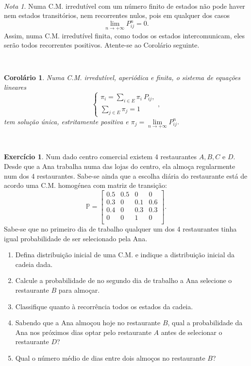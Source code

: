 \documentclass[
  11pt,
  a4paper,
]{book}
\newtheorem{corollary}{Corolário}[chapter]
\theoremstyle{definition}
\theoremstyle{definition}
\theoremstyle{definition}
\newtheorem{exercise}{Exercício}[chapter]
\theoremstyle{definition}
\theoremstyle{remark}
\newtheorem*{remark}{Nota }
\begin{document}
\(\,\)

\begin{remark}
Numa C.M. irredutível com um número finito de estados não pode haver nem estados transitórios, nem recorrentes nulos, pois em qualquer dos casos
\[\lim\limits_{n \to +\infty} P_{ij}^n=0.\]
Assim, numa C.M. irredutível finita, como todos os estados intercomunicam, eles serão todos recorrentes positivos. Atente-se ao Corolário seguinte.
\end{remark}

\(\,\)

\begin{corollary}
Numa C.M. irredutível, aperiódica e finita, o sistema de equações lineares
\[
\begin{cases}
\pi_i = \sum\limits_{i \in E} \pi_i~P_{ij}, \\
\sum\limits_{j \in E} \pi_j =1
\end{cases}, 
\]
tem solução única, estritamente positiva e \(\pi_j=\lim\limits_{n \to +\infty} P_{ij}^n\).
\end{corollary}

\(\,\)

\begin{exercise}

Num dado centro comercial existem 4 restaurantes \(A,B,C\) e \(D\). Desde que a Ana trabalha numa das lojas do centro, ela almoça regularmente num dos 4 restaurantes. Sabe-se ainda que a escolha diária do restaurante está de acordo uma C.M. homogénea com matriz de transição:
\[
\mathbb{P} =
\begin{bmatrix}
0.5 & 0.5 & 0 & 0   \\
0.3 & 0 & 0.1 & 0.6   \\
0.4 & 0 & 0.3 & 0.3   \\
0 & 0 & 1 & 0   \\
\end{bmatrix}.
\]
Sabe-se que no primeiro dia de trabalho qualquer um dos 4 restaurantes tinha igual probabilidade de ser selecionado pela Ana.

\begin{enumerate}
\def\labelenumi{(\alph{enumi})}
\item
  Defina distribuição inicial de uma C.M. e indique a distribuição inicial da cadeia dada.
\item
  Calcule a probabilidade de no segundo dia de trabalho a Ana selecione o restaurante \(B\) para almoçar.
\item
  Classifique quanto à recorrência todos os estados da cadeia.
\item
  Sabendo que a Ana almoçou hoje no restaurante \(B\), qual a probabilidade da Ana nos próximos dias optar pelo restaurante \(A\) antes de selecionar o restaurante \(D\)?
\item
  Qual o número médio de dias entre dois almoços no restaurante \(B\)?
\end{enumerate}

\end{exercise}
\end{document}
